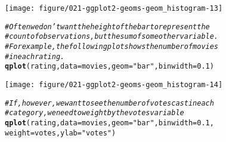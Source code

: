 \documentclass[a4paper,titlepage]{tufte-handout}\usepackage[]{graphicx}\usepackage[]{color}
\makeatletter
\def\maxwidth{ %
  \ifdim\Gin@nat@width>\linewidth
    \linewidth
  \else
    \Gin@nat@width
  \fi
}
\newcommand{\hlnum}[1]{\textcolor[rgb]{0.686,0.059,0.569}{#1}}%
\newcommand{\hlstr}[1]{\textcolor[rgb]{0.192,0.494,0.8}{#1}}%
\newcommand{\hlcom}[1]{\textcolor[rgb]{0.678,0.584,0.686}{\textit{#1}}}%
\newcommand{\hlstd}[1]{\textcolor[rgb]{0.345,0.345,0.345}{#1}}%
\newcommand{\hlkwc}[1]{\textcolor[rgb]{0.333,0.667,0.333}{#1}}%
\newcommand{\hlkwd}[1]{\textcolor[rgb]{0.737,0.353,0.396}{\textbf{#1}}}%
\newenvironment{kframe}{%
 \def\at@end@of@kframe{}%
 \ifinner\ifhmode%
  \def\at@end@of@kframe{\end{minipage}}%
  \begin{minipage}{\columnwidth}%
 \fi\fi%
 \def\FrameCommand##1{\hskip\@totalleftmargin \hskip-\fboxsep
 \colorbox{shadecolor}{##1}\hskip-\fboxsep
     \hskip-\linewidth \hskip-\@totalleftmargin \hskip\columnwidth}%
 \MakeFramed {\advance\hsize-\width
   \@totalleftmargin\z@ \linewidth\hsize
   \@setminipage}}%
 {\par\unskip\endMakeFramed%
 \at@end@of@kframe}
\newenvironment{knitrout}{}{} %
\makeatother
\begin{document}
\begin{knitrout}
\begin{kframe}
{\ttfamily\noindent\color{warningcolor}{\#\# Warning in loop\_apply(n, do.ply): position\_stack requires constant width: output may be incorrect}}\end{kframe}
\texttt{[image: figure/021-ggplot2-geoms-geom\_histogram-13]} 
\begin{kframe}\begin{alltt}
\hlcom{# Often we don't want the height of the bar to represent the}
\hlcom{# count of observations, but the sum of some other variable.}
\hlcom{# For example, the following plot shows the number of movies}
\hlcom{# in each rating.}
\hlkwd{qplot}\hlstd{(rating,} \hlkwc{data}\hlstd{=movies,} \hlkwc{geom}\hlstd{=}\hlstr{"bar"}\hlstd{,} \hlkwc{binwidth} \hlstd{=} \hlnum{0.1}\hlstd{)}
\end{alltt}


{\ttfamily\noindent\color{warningcolor}{\#\# Warning in loop\_apply(n, do.ply): position\_stack requires constant width: output may be incorrect}}\end{kframe}
\texttt{[image: figure/021-ggplot2-geoms-geom\_histogram-14]} 
\begin{kframe}\begin{alltt}
\hlcom{# If, however, we want to see the number of votes cast in each}
\hlcom{# category, we need to weight by the votes variable}
\hlkwd{qplot}\hlstd{(rating,} \hlkwc{data}\hlstd{=movies,} \hlkwc{geom}\hlstd{=}\hlstr{"bar"}\hlstd{,} \hlkwc{binwidth} \hlstd{=} \hlnum{0.1}\hlstd{,}
  \hlkwc{weight}\hlstd{=votes,} \hlkwc{ylab} \hlstd{=} \hlstr{"votes"}\hlstd{)}
\end{alltt}



\end{kframe}
\end{knitrout}
\end{document}
